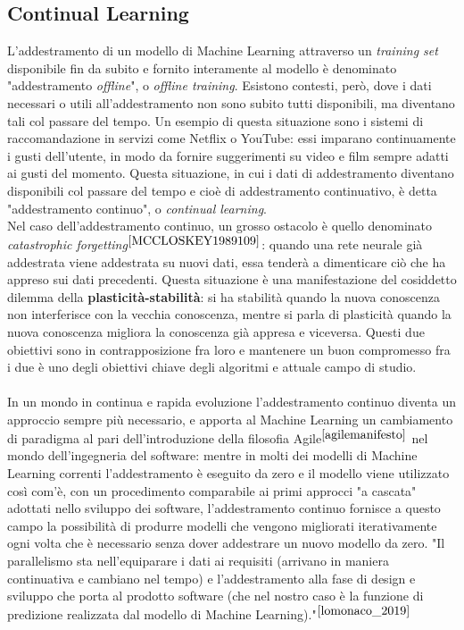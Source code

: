 \subsection{Continual Learning} L'addestramento di un modello di Machine Learning attraverso un \textit{training set} disponibile fin da subito e fornito interamente al modello è denominato "addestramento \textit{offline}", o \textit{offline training}. Esistono contesti, però, dove i dati necessari o utili all'addestramento non sono subito tutti disponibili, ma diventano tali col passare del tempo. Un esempio di questa situazione sono i sistemi di raccomandazione in servizi come Netflix o YouTube: essi imparano continuamente i gusti dell'utente, in modo da fornire suggerimenti su video e film sempre adatti ai gusti del momento. Questa situazione, in cui i dati di addestramento diventano disponibili col passare del tempo e cioè di addestramento continuativo, è detta "addestramento continuo", o \textit{continual learning}.\\
Nel caso dell'addestramento continuo, un grosso ostacolo è quello denominato \textit{catastrophic forgetting}$^{\cite{MCCLOSKEY1989109}}$: quando una rete neurale già addestrata viene addestrata su nuovi dati, essa tenderà a dimenticare ciò che ha appreso sui dati precedenti. Questa situazione è una manifestazione del cosiddetto dilemma della \textbf{plasticità-stabilità}: si ha stabilità quando la nuova conoscenza non interferisce con la vecchia conoscenza, mentre si parla di plasticità quando la nuova conoscenza migliora la conoscenza già appresa e viceversa. Questi due obiettivi sono in contrapposizione fra loro e mantenere un buon compromesso fra i due è uno degli obiettivi chiave degli algoritmi e attuale campo di studio.\\\\
In un mondo in continua e rapida evoluzione l'addestramento continuo diventa un approccio sempre più necessario, e apporta al Machine Learning un cambiamento di paradigma al pari dell'introduzione della filosofia Agile$^{\cite{agilemanifesto}}$ nel mondo dell'ingegneria del software: mentre in molti dei modelli di Machine Learning correnti l'addestramento è eseguito da zero e il modello viene utilizzato così com'è, con un procedimento comparabile ai primi approcci "a cascata" adottati nello sviluppo dei software, l'addestramento continuo fornisce a questo campo la possibilità di produrre modelli che vengono migliorati iterativamente ogni volta che è necessario senza dover addestrare un nuovo modello da zero. "Il parallelismo sta nell'equiparare i dati ai requisiti (arrivano in maniera continuativa e cambiano nel tempo) e l'addestramento alla fase di design e sviluppo che porta al prodotto software (che nel nostro caso è la funzione di predizione realizzata dal modello di Machine Learning)."$^{\cite{lomonaco_2019}}$
